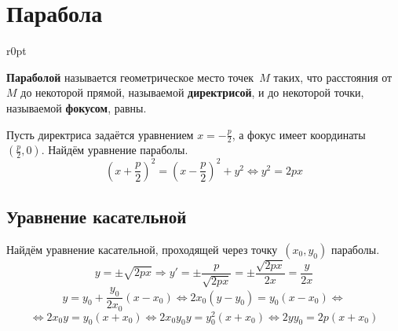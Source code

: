\section{Парабола}
\begin{wrapfigure}{r}{0pt}\noindent
{}
\end{wrapfigure}

 \textbf{Параболой} называется геометрическое место точек~$M$ таких, что расстояния от~$M$ до некоторой прямой, называемой \textbf{директрисой}, и до некоторой точки, называемой \textbf{фокусом}, равны.

Пусть директриса задаётся уравнением $x = -\frac{p}2$, а фокус имеет координаты~$\left(\frac{p}2, 0\right)$.
Найдём уравнение параболы.
\begin{equation*}
\left(x + \frac{p}2\right)^2 = \left(x - \frac{p}2\right)^2 + y^2 \Leftrightarrow
y^2 = 2px
\end{equation*}

\subsection{Уравнение касательной}
Найдём уравнение касательной, проходящей через точку~$(x_0, y_0)$ параболы.
\begin{equation*}
y = \pm\sqrt{2px} \Rightarrow
y' = \pm\frac{p}{\sqrt{2px}} =
\pm\frac{\sqrt{2px}}{2x} =
\frac{y}{2x}
\end{equation*}
\begin{equation*}
y = y_0 + \frac{y_0}{2x_0} (x - x_0) \Leftrightarrow
2 x_0 (y - y_0) = y_0 (x - x_0) \Leftrightarrow
\end{equation*}
\begin{equation*}
\Leftrightarrow 2 x_0 y = y_0 (x + x_0) \Leftrightarrow
2 x_0 y_0 y = y_0^2 (x + x_0) \Leftrightarrow
2 y y_0 = 2p(x + x_0)
\end{equation*}
